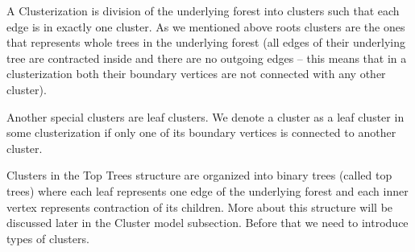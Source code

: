 A {\I Clusterization} is division of the underlying forest into clusters such
that each edge is in exactly one cluster. As we mentioned above {\I roots
clusters} are the ones that represents whole trees in the underlying forest
(all edges of their underlying tree are contracted inside and there are no
outgoing edges -- this means that in a clusterization both their boundary
vertices are not connected with any other cluster).

Another special clusters are {\I leaf clusters}. We denote a cluster as a
{\I leaf cluster} in some clusterization if only one of its boundary vertices is
connected to another cluster.

Clusters in the Top Trees structure are organized into binary trees (called
{\I top trees}) where each leaf represents one edge of the underlying forest and
each inner vertex represents contraction of its children. More about this
structure will be discussed later in the {\I Cluster model} subsection. Before
that we need to introduce types of clusters.

